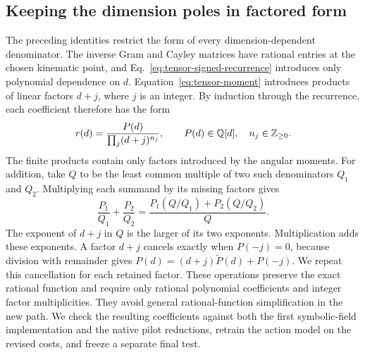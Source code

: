 \subsection{Keeping the dimension poles in factored form}
The preceding identities restrict the form of every dimension-dependent denominator. The inverse Gram and Cayley matrices have rational entries at the chosen kinematic point, and Eq.~\eqref{eq:tensor-signed-recurrence} introduces only polynomial dependence on $d$. Equation~\eqref{eq:tensor-moment} introduces products of linear factors $d+j$, where $j$ is an integer. By induction through the recurrence, each coefficient therefore has the form
\begin{equation}
 r(d)=\frac{P(d)}{\prod_j(d+j)^{n_j}},\qquad
 P(d)\in\mathbb Q[d],\quad n_j\in\mathbb Z_{\geq0}.
 \label{eq:tensor-factored-field}
\end{equation}
The finite products contain only factors introduced by the angular moments. For addition, take $Q$ to be the least common multiple of two such denominators $Q_1$ and $Q_2$. Multiplying each summand by its missing factors gives
\begin{equation}
 \frac{P_1}{Q_1}+\frac{P_2}{Q_2}
 =\frac{P_1(Q/Q_1)+P_2(Q/Q_2)}{Q}.
 \label{eq:tensor-factored-add}
\end{equation}
The exponent of $d+j$ in $Q$ is the larger of its two exponents. Multiplication adds these exponents. A factor $d+j$ cancels exactly when $P(-j)=0$, because division with remainder gives $P(d)=(d+j)\widetilde P(d)+P(-j)$. We repeat this cancellation for each retained factor. These operations preserve the exact rational function and require only rational polynomial coefficients and integer factor multiplicities. They avoid general rational-function simplification in the new path. We check the resulting coefficients against both the first symbolic-field implementation and the native pilot reductions, retrain the action model on the revised costs, and freeze a separate final test.

